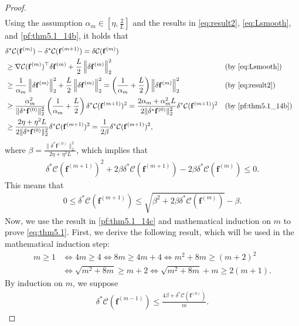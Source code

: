 \documentclass[onefignum,onetabnum]{siamonline220329}
\numberwithin{equation}{section}
\def\f{\mathbf{f}}
\begin{document}
\begin{sloppypar}
\begin{proof}
\begin{align}
\end{align}
Using the assumption $\alpha_m \in [\eta,\frac{2}{L}]$ and the results in \eqref{eq:result2}, \eqref{eq:Lsmooth}, and \eqref{pf:thm5.1_14b}, it holds that
\begin{align*}
&\delta^*\mathcal{C}(\f^{(m)}) - \delta^*\mathcal{C}(\f^{(m+1)}) 
= \delta\mathcal{C}(\f^{(m)}) \\
&\geq \nabla\mathcal{C}(\f^{(m)})^\top \delta\f^{(m)} + \frac{L}{2} \left\| \delta\f^{(m)} \right\|_2^2 && \text{(by \eqref{eq:Lsmooth})} \\
&\geq \frac{1}{\alpha_m} \left\| \delta\f^{(m)} \right\|_2^2 + \frac{L}{2} \left\| \delta\f^{(m)} \right\|_2^2 = \left( \frac{1}{\alpha_m} + \frac{L}{2} \right) \left\| \delta\f^{(m)} \right\|_2^2  && \text{(by \eqref{eq:result2})}\\
&
\geq \frac{\alpha_m^2}{\| \delta^*\f^{(0)} \|_2^2} \left( \frac{1}{\alpha_m} + \frac{L}{2} \right) \delta^*\mathcal{C}(\f^{(m+1)})^2 
= \frac{2\alpha_m+\alpha_m^2 L}{2\|\delta^*\f^{(0)}\|_2^2} \delta^*\mathcal{C}(\f^{(m+1)})^2 && \text{(by \eqref{pf:thm5.1_14b})} \\
&\geq \frac{2\eta + \eta^2 L}{2\|\delta^*\f^{(0)}\|_2^2} \delta^*\mathcal{C}(\f^{(m+1)})^2 
= \frac{1}{2\beta} \delta^*\mathcal{C}(\f^{(m+1)})^2,  
\end{align*}
where $\beta = \frac{\|\delta^*\f^{(0)}\|_2^2}{2\eta+\eta^2 L}$,
which implies that
\begin{align*}
\delta^*\mathcal{C}(\f^{(m+1)})^2 + 2\beta \delta^*\mathcal{C}(\f^{(m+1)}) - 2\beta \delta^*\mathcal{C}(\f^{(m)}) \leq 0.
\end{align*}
This means that
\begin{align}
0\leq \delta^*\mathcal{C}(\f^{(m+1)}) \leq \sqrt{\beta^2 + 2\beta \delta^*\mathcal{C}(\f^{(m)})} - \beta. \label{pf:thm5.1_14c}
\end{align}
Now, we use the result in \eqref{pf:thm5.1_14c} and mathematical induction on $m$ to prove \eqref{eq:thm5.1}. First, we derive the following result, which will be used in the mathematical induction step:
\begin{align*}
m\geq 1 
&\iff 4m\geq 4 
\iff 8m \geq 4m+4 
\iff m^2+8m \geq (m+2)^2 \\
&\iff \sqrt{m^2+8m} \geq m+2
\iff \sqrt{m^2+8m} + m \geq 2(m+1).
\end{align*}
By induction on $m$, we suppose
\begin{align}
\delta^*\mathcal{C}(\f^{(m-1)}) \leq \frac{4\beta + \delta^*\mathcal{C}(\f^{(0)})}{m}. \label{eq:induction_m}

\end{align}
\end{proof}
\end{sloppypar}
\end{document}
